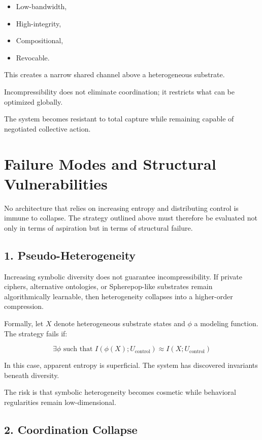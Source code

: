 \documentclass[12pt]{article}
\begin{document}
\begin{itemize}
\item Low-bandwidth,
\item High-integrity,
\item Compositional,
\item Revocable.
\end{itemize}

This creates a narrow shared channel above a heterogeneous substrate.

Incompressibility does not eliminate coordination; it restricts what can be optimized globally.

The system becomes resistant to total capture while remaining capable of negotiated collective action.

\section{Failure Modes and Structural Vulnerabilities}

No architecture that relies on increasing entropy and distributing control is immune to collapse. The strategy outlined above must therefore be evaluated not only in terms of aspiration but in terms of structural failure.

\subsection*{1. Pseudo-Heterogeneity}

Increasing symbolic diversity does not guarantee incompressibility. If private ciphers, alternative ontologies, or Spherepop-like substrates remain algorithmically learnable, then heterogeneity collapses into a higher-order compression.

Formally, let $X$ denote heterogeneous substrate states and $\phi$ a modeling function. The strategy fails if:

\[
\exists \phi \text{ such that } I(\phi(X); U_{\text{control}}) \approx I(X; U_{\text{control}})
\]

In this case, apparent entropy is superficial. The system has discovered invariants beneath diversity.

The risk is that symbolic heterogeneity becomes cosmetic while behavioral regularities remain low-dimensional.

\subsection*{2. Coordination Collapse}
\end{document}
